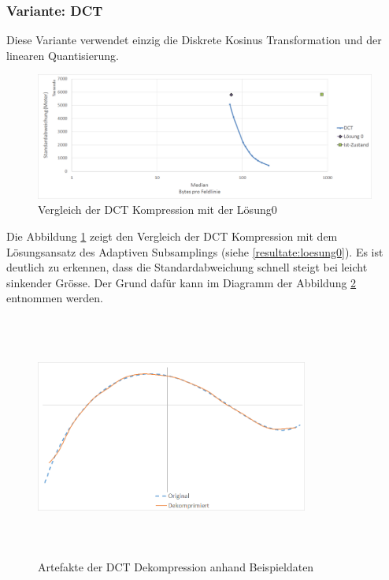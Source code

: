 \subsubsection{Variante: DCT}\label{resultate:dct}
Diese Variante verwendet einzig die Diskrete Kosinus Transformation und der linearen Quantisierung.
\begin{figure}[!htbp]
	\center
	\includegraphics[width=1\textwidth,keepaspectratio]{./pictures/resultate/loesung1/loesung1-0/loesung1_0.png}
	\caption{Vergleich der DCT Kompression mit der Lösung0}
	\label{resultate:loesung1:dct:resultate}
\end{figure}
Die Abbildung \ref{resultate:loesung1:dct:resultate} zeigt den Vergleich der DCT Kompression mit dem Lösungsansatz des Adaptiven Subsamplings (siehe \ref{resultate:loesung0}). Es ist deutlich zu erkennen, dass die Standardabweichung schnell steigt bei leicht sinkender Grösse. Der Grund dafür kann im Diagramm der Abbildung \ref{resultate:loesung1:dct:artefakte} entnommen werden. 
\begin{figure}[!htbp]
	\center
	\includegraphics[width=0.8\textwidth,height=8cm,keepaspectratio]{./pictures/resultate/loesung1/loesung1-0/loesung1_0_artefakte.png}
	\caption{Artefakte der DCT Dekompression anhand Beispieldaten}
	\label{resultate:loesung1:dct:artefakte}
\end{figure}
